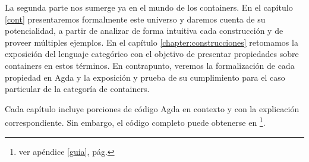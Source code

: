 La segunda parte nos sumerge ya en el mundo de los containers. En el capítulo \ref{cont} presentaremos formalmente este universo y daremos cuenta de su potencialidad, a partir de analizar de forma intuitiva cada construcción y de proveer múltiples ejemplos. En el capítulo \ref{chapter:construcciones} retomamos la exposición del lenguaje categórico con el objetivo de presentar propiedades sobre containers en estos términos. En contrapunto, veremos la formalización de cada propiedad en Agda y la exposición y prueba de su cumplimiento para el caso particular de la categoría de containers.

Cada capítulo incluye porciones de código Agda en contexto y con la explicación correspondiente. Sin embargo, el código completo puede obtenerse en \gitcode\footnote{ver apéndice \ref{guia}, pág. \pageref{guia}}.
